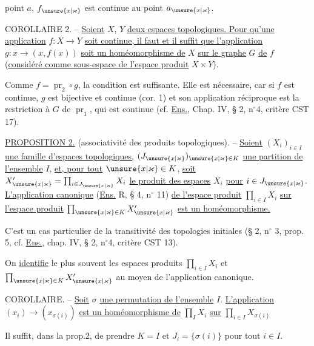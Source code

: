 point $a$, $f_{\unsure{x|\varkappa}}$ est continue au point $a_{\unsure{x|\varkappa}}$.

COROLLAIRE 2. -- \uline{Soient} $X$, $Y$ \uline{deux espaces topologiques. Pour qu'une application} $f:X\to Y$ \uline{soit continue, il faut et il suffit que l'application} $g:x\to(x,f(x))$ \uline{soit un homéomorphisme de} $X$ \uline{sur le graphe} $G$ \uline{de} $f$ (\uline{considéré comme sous-espace de l'espace produit} $X\times Y$).

Comme $f=\operatorname{pr}_2\circ g$, la condition est suffisante. Elle est nécessaire, car si $f$ est continue, $g$ est bijective et continue (cor. 1) et son application réciproque est la restriction à $G$ de $\operatorname{pr}_1$, qui est continue (cf. \uline{Ens.}, Chap. IV, § 2, n$^{\circ}$4, critère CST 17).

\uline{PROPOSITION 2.} (associativité des produits topologiques). -- \uline{Soient} $(X_i)_{i\in I}$ \uline{une famille d'espaces topologiques,} $(J_{\unsure{x|\varkappa}})_{\unsure{x|\varkappa}\in K}$ \uline{une partition de l'ensemble} $I$, \uline{et, pour tout} $\unsure{x|\varkappa}\in K$, \uline{soit} $X'_{\unsure{x|\varkappa}}=\prod_{i\in J_{\unsure{x|\varkappa}}}X_i$ \uline{le produit des espaces} $X_i$ \uline{pour} $i\in J_{\unsure{x|\varkappa}}$. \uline{L'application canonique} (\uline{Ens.} R, § 4, n$^{\circ}$ 11) \uline{de l'espace produit} $\prod_{i\in I}X_i$ \uline{sur l'espace produit} $\prod_{\unsure{x|\varkappa}\in K}X'_{\unsure{x|\varkappa}}$ \uline{est un homéomorphisme.}

C'est un cas particulier de la transitivité des topologies initiales (§ 2, n$^{\circ}$ 3, prop. 5, cf. \uline{Ens.}, chap. IV, § 2, n$^{\circ}$4, critère CST 13).

On \uline{identifie} le plus souvent les espaces produits $\prod_{i\in I}X_i$ et $\prod_{\unsure{x|\varkappa}\in K}X'_{\unsure{x|\varkappa}}$ au moyen de l'application canonique.

COROLLAIRE. -- \uline{Soit} $\sigma$ \uline{une permutation de l'ensemble} $I$. \uline{L'application} $(x_i)\to(x_{\sigma(i)})$ \uline{est un homéomorphisme de} $\prod_I X_i$ \uline{sur} $\prod_{i\in I}X_{\sigma(i)}$

Il suffit, dans la prop.2, de prendre $K=I$ et $J_i=\{\sigma(i)\}$ pour tout $i\in I$.

